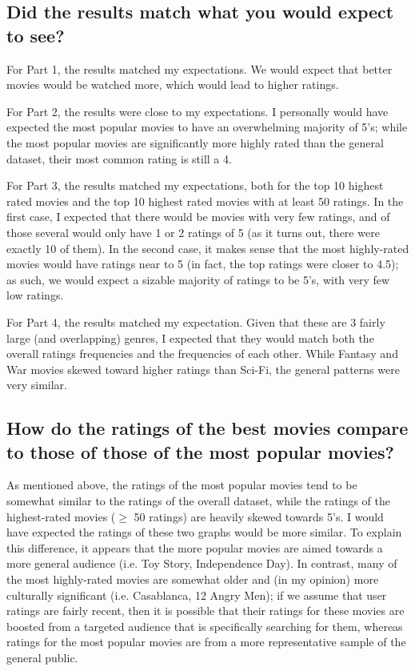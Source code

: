 \subsection*{Did the results match what you would expect to see?}
For Part 1, the results matched my expectations. We would expect that better movies would be watched more, which would lead to higher ratings. 

For Part 2, the results were close to my expectations. I personally would have expected the most popular movies to have an overwhelming majority of 5's; while the most popular movies are significantly more highly rated than the general dataset, their most common rating is still a 4.

For Part 3, the results matched my expectations, both for the top 10 highest rated movies and the top 10 highest rated movies with at least 50 ratings. In the first case, I expected that there would be movies with very few ratings, and of those several would only have 1 or 2 ratings of 5 (as it turns out, there were exactly 10 of them). In the second case, it makes sense that the most highly-rated movies would have ratings near to 5 (in fact, the top ratings were closer to 4.5); as such, we would expect a sizable majority of ratings to be 5's, with very few low ratings.

For Part 4, the results matched my expectation. Given that these are 3 fairly large (and overlapping) genres, I expected that they would match both the overall ratings frequencies and the frequencies of each other. While Fantasy and War movies skewed toward higher ratings than Sci-Fi, the general patterns were very similar.
\smallskip
\subsection*{How do the ratings of the best movies compare to those of those of the most popular movies?}
As mentioned above, the ratings of the most popular movies tend to be somewhat similar to the ratings of the overall dataset, while the ratings of the highest-rated movies ($\geq$ 50 ratings) are heavily skewed towards 5's. I would have expected the ratings of these two graphs would be more similar. To explain this difference, it appears that the more popular movies are aimed towards a more general audience (i.e. Toy Story, Independence Day). In contrast, many of the most highly-rated movies are somewhat older and (in my opinion) more culturally significant (i.e. Casablanca, 12 Angry Men); if we assume that user ratings are fairly recent, then it is possible that their ratings for these movies are boosted from a targeted audience that is specifically searching for them, whereas ratings for the most popular movies are from a more representative sample of the general public.

